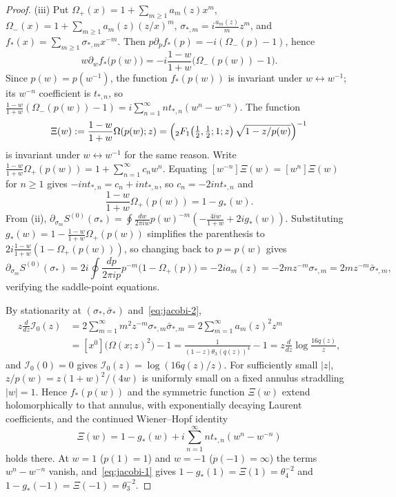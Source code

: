 \documentclass[twoside,10pt]{article}
\numberwithin{equation}{section}
\theoremstyle{slbody}
\theoremstyle{definition}
\theoremstyle{remark}
\begin{document}
\begin{proof}
(iii) Put \(\Omega_+(x)=1+\sum_{m\geq1}a_m(z)x^m\),
\(\Omega_-(x)=1+\sum_{m\geq1}a_m(z)(z/x)^m\),
\(\sigma_{*,m}=i\frac{a_m(z)}{m}z^m\), and
\(f_*(x)=\sum_{m\geq1}\sigma_{*,m}x^{-m}\).
Then \(p\partial_p f_*(p)=-i(\Omega_-(p)-1)\), hence
\[
 w\partial_w f_*\bigl(p(w)\bigr)
 =-i\frac{1-w}{1+w}\bigl(\Omega_-(p(w))-1\bigr).
\]
Since \(p(w)=p(w^{-1})\), the function \(f_*(p(w))\) is invariant under
\(w\leftrightarrow w^{-1}\); its \(w^{-n}\) coefficient is \(t_{*,n}\), so
\(\frac{1-w}{1+w}(\Omega_-(p(w))-1)=i\sum_{n=1}^\infty n t_{*,n}(w^n-w^{-n})\).
The function
\[
 \Xi(w):=\frac{1-w}{1+w}\Omega(p(w);z)
 =\Bigl({}_2F_1\!\left(\tfrac12,\tfrac12;1;z\right)\sqrt{1-z/p(w)}\Bigr)^{-1}
\]
is invariant under \(w\leftrightarrow w^{-1}\) for the same reason.  Write
\(\frac{1-w}{1+w}\Omega_+(p(w))=1+\sum_{n=1}^\infty c_n w^n\).  Equating
\([w^{-n}]\Xi(w)=[w^n]\Xi(w)\) for \(n\geq1\) gives \(-int_{*,n}=c_n+int_{*,n}\), so \(c_n=-2int_{*,n}\) and
\begin{equation}\label{eq:wh-identity}
 \frac{1-w}{1+w}\Omega_+(p(w))=1-g_*(w).
\end{equation}
From (ii),
\(\partial_{\sigma_m}S^{(0)}(\sigma_*)=\oint\frac{dw}{2\pi i w}p(w)^{-m}(-\frac{4iw}{1+w}+2ig_*(w))\).
Substituting \(g_*(w)=1-\frac{1-w}{1+w}\Omega_+(p(w))\) simplifies the
parenthesis to \(2i\frac{1-w}{1+w}(1-\Omega_+(p(w)))\), so changing back to
\(p=p(w)\) gives
\[
 \partial_{\sigma_m}S^{(0)}(\sigma_*)
 =2i\oint\frac{dp}{2\pi i p}p^{-m}\bigl(1-\Omega_+(p)\bigr)
 =-2ia_m(z)
 =-2mz^{-m}\sigma_{*,m}
 =2mz^{-m}\bar\sigma_{*,m},
\]
verifying the saddle-point equations.

By stationarity at \((\sigma_*,\bar\sigma_*)\) and~\eqref{eq:jacobi-2},
\begin{align*}
 z\frac{d}{dz}\mathcal I_0(z)
 &=2\sum_{m=1}^\infty m^2 z^{-m}\sigma_{*,m}\bar\sigma_{*,m}
  =2\sum_{m=1}^\infty a_m(z)^2 z^m\\
 &=[x^0]\bigl(\Omega(x;z)^2\bigr)-1
  =\frac{1}{(1-z)\theta_3(q(z))^4}-1
  =z\frac{d}{dz}\log\frac{16q(z)}{z},
\end{align*}
and \(\mathcal I_0(0)=0\) gives \(\mathcal I_0(z)=\log(16q(z)/z)\).
For sufficiently small \(|z|\), \(z/p(w)=z(1+w)^2/(4w)\) is uniformly small on
a fixed annulus straddling \(|w|=1\).  Hence \(f_*(p(w))\) and the symmetric
function \(\Xi(w)\) extend holomorphically to that annulus, with exponentially
decaying Laurent coefficients, and the continued Wiener--Hopf identity
\[
 \Xi(w)=1-g_*(w)+i\sum_{n=1}^\infty nt_{*,n}(w^n-w^{-n})
\]
holds there.  At \(w=1\) (\(p(1)=1\)) and \(w=-1\) (\(p(-1)=\infty\)) the
terms \(w^n-w^{-n}\) vanish, and~\eqref{eq:jacobi-1} gives
\(1-g_*(1)=\Xi(1)=\theta_4^{-2}\) and \(1-g_*(-1)=\Xi(-1)=\theta_3^{-2}\).
\end{proof}
\end{document}
